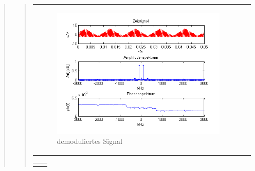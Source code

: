 \begin{quote}
\begin{quote}
\begin{center}
\begin{tabular}{ll}
            \begin{minipage}{0.67\textwidth}
                \begin{figure}[H]
                    \includegraphics[scale=0.7]{Bilder/Demo_Dre_2k_100Hz_mo_ohneTiefpass}
                    \caption{demoduliertes Signal}
                     \label{fig:DemodreieckoT2}
                \end{figure}
        
            \end{minipage}
        
        \end{tabular}
        \end{center}
        
         \begin{center}
        \begin{tabular}{ll}
        
        \hspace{-5cm}
            \begin{minipage}{0.67\textwidth}
                

\end{minipage}
\end{tabular}
\end{center}
\end{quote}
\end{quote}

